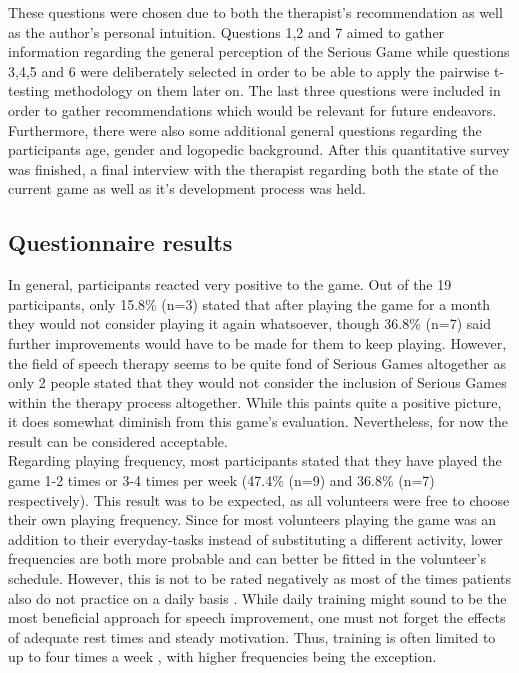 \documentclass[draft,final]{vutinfth} %
\begin{document}
These questions were chosen due to both the therapist's recommendation as well as the author's personal intuition. Questions 1,2 and 7 aimed to gather information regarding the general perception of the Serious Game while questions 3,4,5 and 6 were deliberately selected in order to be able to apply the pairwise t-testing methodology on them later on. The last three questions were included in order to gather recommendations which would be relevant for future endeavors.
Furthermore, there were also some additional general questions regarding the participants age, gender and logopedic background. After this quantitative survey was finished, a final interview with the therapist regarding both the state of the current game as well as it's development process was held.

\subsection{Questionnaire results}

In general, participants reacted very positive to the game. Out of the 19 participants, only 15.8\% (n=3) stated that after playing the game for a month they would not consider playing it again whatsoever, though 36.8\% (n=7) said further improvements would have to be made for them to keep playing. However, the field of speech therapy seems to be quite fond of Serious Games altogether as only 2 people stated that they would not consider the inclusion of Serious Games within the therapy process altogether. While this paints quite a positive picture, it does somewhat diminish from this game's evaluation. Nevertheless, for now the result can be considered acceptable. \\
Regarding playing frequency, most participants stated that they have played the game 1-2 times or 3-4 times per week (47.4\% (n=9) and 36.8\% (n=7) respectively). This result was to be expected, as all volunteers were free to choose their own playing frequency. Since for most volunteers playing the game was an addition to their everyday-tasks instead of substituting a different activity, lower frequencies are both more probable and can better be fitted in the volunteer's schedule. However, this is not to be rated negatively as most of the times patients also do not practice on a daily basis \cite{proestler2023}. While daily training might sound to be the most beneficial approach for speech improvement, one must not forget the effects of adequate rest times and steady motivation. Thus, training is often limited to up to four times a week \cite{proestler2023}, with higher frequencies being the exception.\\
\end{document}
